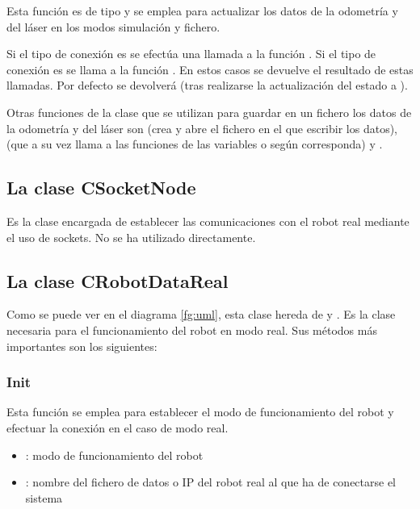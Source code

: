 \noindent
Esta función es de tipo  y se emplea para actualizar los datos de la odometría y del láser en los modos simulación y fichero.

\noindent
Si el tipo de conexión es  se efectúa una llamada a la función . Si el tipo de conexión es  se llama a la función . En estos casos se devuelve el resultado de estas llamadas. Por defecto se devolverá  (tras realizarse la actualización del estado a ).

\vspace{0.2cm}
Otras funciones de la clase que se utilizan para guardar en un fichero los datos de la odometría y del láser son  (crea y abre el fichero en el que escribir los datos),  (que a su vez llama a las funciones  de las variables  o  según corresponda) y .

\subsection{La clase CSocketNode}
Es la clase encargada de establecer las comunicaciones con el robot real mediante el uso de sockets. No se ha utilizado directamente.

\subsection{La clase CRobotDataReal}
Como se puede ver en el diagrama \ref{fg:uml}, esta clase hereda de y . Es la clase necesaria para el funcionamiento del robot en modo real. Sus métodos más importantes son los siguientes:

\subsubsection{Init}

\noindent
{}

\noindent
Esta función se emplea para establecer el modo de funcionamiento del robot y efectuar la conexión en el caso de modo real.
\begin{itemize}
  \item {}: modo de funcionamiento del robot
  \item {}: nombre del fichero de datos o IP del robot real al que ha de conectarse el sistema
\end{itemize}

